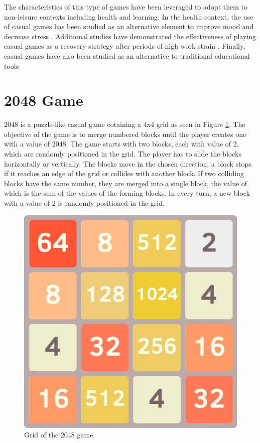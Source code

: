 The characteristics of this type of games have been leveraged to adopt them to non-leisure contexts including health and learning. In the health context, the use of casual games has been studied as an alternative element to improve mood and decrease stress \citep{russoniello2009effectiveness}. Additional studies have demonstrated the effectiveness of playing casual games as a recovery strategy after periods of high work strain \citep{reinecke2009games}. Finally, casual games have also been studied as an alternative to traditional educational tools \citep{peirce2010personalised}

\section{2048 Game}
2048 is a puzzle-like casual game cotaining a 4x4 grid as seen in Figure \ref{fig:2048-grid}. The objective of the game is to merge numbered blocks until the player creates one with a value of 2048. The game starts with two blocks, each with value of 2, which are randomly positioned in the grid. The player has to slide the blocks horizontally or vertically. The blocks move in the chosen direction; a block stops if it reaches an edge of the grid or collides with another block. If two colliding blocks have the same number, they are merged into a single block, the value of which is the sum of the values of the forming blocks. In every turn, a new block with a value of 2 is randomly positioned in the grid.

\begin{figure}[htb]
    \vskip 5mm
        \begin{center}
            \includegraphics[scale=0.5]{./Figures/game_grid.png}
            \caption{Grid of the 2048 game.}
            \label{fig:2048-grid}
        \end{center}
    \vskip -5mm
\end{figure}


